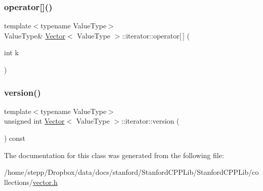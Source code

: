 \mbox{\label{classVector_1_1iterator_aa7d2060a0008b6a2e9fdfece93fe4929}} 
\subsubsection{\texorpdfstring{operator[]()}{operator[]()}}
{\footnotesize\ttfamily template$<$typename Value\+Type$>$ \\
Value\+Type\& \mbox{\hyperlink{classVector}{Vector}}$<$ Value\+Type $>$\+::iterator\+::operator\mbox{[}$\,$\mbox{]} (\begin{DoxyParamCaption}\item[{int}]{k }\end{DoxyParamCaption})\hspace{0.3cm}{\ttfamily [inline]}}

\mbox{\label{classVector_1_1iterator_ad0e79d724133c3ebd1e4ea42d290aaab}} 
\subsubsection{\texorpdfstring{version()}{version()}}
{\footnotesize\ttfamily template$<$typename Value\+Type$>$ \\
unsigned int \mbox{\hyperlink{classVector}{Vector}}$<$ Value\+Type $>$\+::iterator\+::version (\begin{DoxyParamCaption}{ }\end{DoxyParamCaption}) const\hspace{0.3cm}{\ttfamily [inline]}}



The documentation for this class was generated from the following file\+:\begin{DoxyCompactItemize}
\item 
/home/stepp/\+Dropbox/data/docs/stanford/\+Stanford\+C\+P\+P\+Lib/\+Stanford\+C\+P\+P\+Lib/collections/\mbox{\hyperlink{vector_8h}{vector.\+h}}\end{DoxyCompactItemize}
